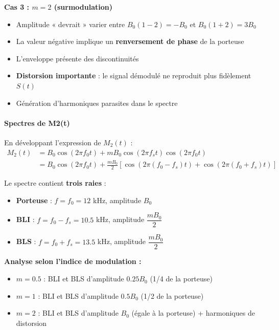 \documentclass[11pt,a4paper]{article}
\begin{document}
\textbf{Cas 3 : $m = 2$ (surmodulation)}

\begin{itemize}
    \item Amplitude « devrait » varier entre $B_0(1-2) = -B_0$ et $B_0(1+2) = 3 B_0$
    \item La valeur négative implique un \textbf{renversement de phase} de la porteuse
    \item L'enveloppe présente des discontinuités
    \item \textbf{Distorsion importante} : le signal démodulé ne reproduit plus fidèlement $S(t)$
    \item Génération d'harmoniques parasites dans le spectre
\end{itemize}

\paragraph{Spectres de M2(t)}

En développant l'expression de $M_2(t)$ :
\begin{align}
M_2(t) &= B_0\cos(2\pi f_0 t) + m B_0 \cos(2\pi f_s t) \cos(2\pi f_0 t) \\
&= B_0\cos(2\pi f_0 t) + \frac{m B_0}{2}[\cos(2\pi(f_0-f_s)t) + \cos(2\pi(f_0+f_s)t)]
\end{align}

Le spectre contient \textbf{trois raies} :

\begin{itemize}
    \item \textbf{Porteuse} : $f = f_0 = 12$ kHz, amplitude $B_0$
    \item \textbf{BLI} : $f = f_0 - f_s = 10.5$ kHz, amplitude $\dfrac{m B_0}{2}$
    \item \textbf{BLS} : $f = f_0 + f_s = 13.5$ kHz, amplitude $\dfrac{m B_0}{2}$
\end{itemize}

\textbf{Analyse selon l'indice de modulation :}

\begin{itemize}
    \item $m = 0.5$ : BLI et BLS d'amplitude $0.25 B_0$ (1/4 de la porteuse)
    \item $m = 1$ : BLI et BLS d'amplitude $0.5 B_0$ (1/2 de la porteuse)
    \item $m = 2$ : BLI et BLS d'amplitude $B_0$ (égale à la porteuse) + harmoniques de distorsion
\end{itemize}
\end{document}
